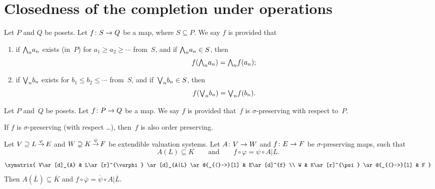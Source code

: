 \documentclass[main.tex]{subfiles}
\begin{document}
\section{Closedness of the completion under operations}
%
%
\begin{dfn}
Let $P$ and $Q$ be posets.
Let $f\colon S\rightarrow Q$ be a map, where $S\subseteq P$.
We say $f$ is 
provided that
\begin{enumerate}
\item
if 
$\textstyle{\bigwedge}_n{a_n}$ exists
(in~$P$)
for
$a_1 \geq a_2 \geq \dotsb$
from~$S$,
and if $\textstyle{\bigwedge}_n a_n\in S$,
then 
\begin{equation*}
f(\textstyle{\bigwedge}_n a_n) = \textstyle{\bigwedge}_n f(a_n);
\end{equation*}

\item
if 
$\textstyle{\bigvee}_n{b_n}$ exists
for
$b_1 \leq b_2 \leq \dotsb$
from~$S$,
and if~$\textstyle{\bigvee}_n b_n\in S$,
then 
\begin{equation*}
f(\textstyle{\bigvee}_n b_n) = \textstyle{\bigvee}_n f(b_n).
\end{equation*}
\end{enumerate}
Let $P$ and~$Q$ be posets. Let $f\colon P \rightarrow Q$ be a map.
We say $f$ is 
provided that~$f$ is $\sigma$-preserving with respect to~$P$.
\end{dfn}
\begin{rem}
If $f$ is $\sigma$-preserving
(with respect \ldots),
then~$f$ is also order preserving.
\end{rem}
%
%
\begin{thm}
\label{T:ext1}
Let $V \supseteq L\,\smash{\stackrel{\varphi}{\rightarrow}}\,E$ and
 $W \supseteq K\,\smash{\stackrel{\psi}{\rightarrow}}\,F$ be extendible valuation systems.
Let
$A\colon V\rightarrow W$
and 
$f\colon E\rightarrow F$ be $\sigma$-preserving maps,
such that 
\begin{equation*}
A(L)\subseteq K
\qquad\text{and}\qquad
f \circ \varphi = \psi \circ A|L.
\end{equation*}
\begin{equation*}
\xymatrix{
V\ar[d]_{A} & 
  L\ar[r]^{\varphi} \ar[d]_{A|L} \ar@{_{(}->}[l] & 
  E\ar[d]^{f} \\
W &
  K\ar[r]^{\psi} \ar@{_{(}->}[l] & 
  F
}\end{equation*}
Then $A(\overline{L})\subseteq \overline{K}$
and $f \circ \overline\varphi = \overline\psi\circ A|\overline L$.
\end{thm}
\end{document}
